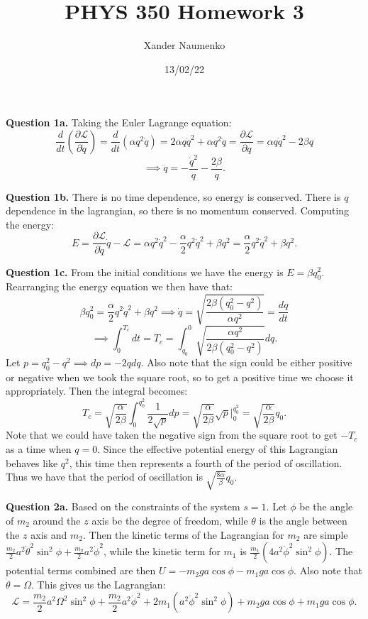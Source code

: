 \documentclass[letterpaper, reqno,11pt]{article}
\begin{document}
\title{PHYS 350 Homework 3}
\date{13/02/22}
\author{Xander Naumenko}
\maketitle

{\noindent\bf Question 1a.} Taking the Euler Lagrange equation: 
\[
\frac{d}{dt}\left( \frac{\partial\mathcal L}{\partial \dot q} \right)=\frac{d}{dt}\left( \alpha q^2\dot q\right)=2\alpha q\dot q^2+\alpha q^2\ddot q=\frac{\partial\mathcal L}{\partial q}=\alpha q\dot q^2-2\beta q
\]
\[
\implies\ddot q=-\frac{\dot q^2}{q}-\frac{2\beta}{q}
.\]

{\noindent\bf Question 1b.} There is no time dependence, so energy is conserved. There is $q$ dependence in the lagrangian, so there is no momentum conserved. Computing the energy: 
\[
E=\frac{\partial\mathcal L}{\partial \dot q}\dot q-\mathcal L=\alpha q^2\dot q^2-\frac{\alpha}{2}q^2\dot q^2+\beta q^2=\frac{\alpha}{2} q^2\dot q^2+\beta q^2
.\]

{\noindent\bf Question 1c.} From the initial conditions we have the energy is $E=\beta q_0^2$. Rearranging the energy equation we then have that: 
\[
\beta q_0^2=\frac{\alpha}{2} q^2\dot q^2+\beta q^2\implies \dot q=\sqrt{\frac{2\beta\left( q_0^2-q^2 \right) }{\alpha q^2}}=\frac{dq}{dt}
\]
\[
\implies \int_0^{T_c} dt=T_c=\int_{q_0}^0 \sqrt{\frac{\alpha q^2}{2\beta\left( q_0^2-q^2 \right) }} dq
.\]
Let $p=q_0^2-q^2\implies dp=-2qdq$. Also note that the sign could be either positive or negative when we took the square root, so to get a positive time we choose it appropriately. Then the integral becomes: 
\[
T_c=\sqrt{\frac{\alpha}{2\beta}} \int_{0}^{q_0^2} \frac{1}{2\sqrt{p} }dp=\sqrt{\frac{\alpha}{2\beta}}\sqrt{p} \bigg|_0^{q_0^2}=\sqrt{\frac{\alpha}{2\beta}} q_0
.\]
Note that we could have taken the negative sign from the square root to get $-T_c$ as a time when $q=0$. Since the effective potential energy of this Lagrangian behaves like $q^2$, this time then represents a fourth of the period of oscillation. Thus we have that the period of oscillation is $ \sqrt{\frac{8\alpha}{\beta}} q_0$. 

{\noindent\bf Question 2a.} Based on the constraints of the system $s=1$. Let $\phi$ be the angle of $ m_2$ around the $z$ axis be the degree of freedom, while $\theta$ is the angle between the $z$ axis and $m_2$. Then the kinetic terms of the Lagrangian for $m_2$ are simple $ \frac{m_2}{2}a^2\dot\theta ^2\sin^2\phi+\frac{m_2}{2}a^2\dot\phi^2 $, while the kinetic term for $m_1$ is $\frac{m_1}{2}\left( 4a^2\dot\phi^2\sin^2\phi \right) $. The potential terms combined are then $U=-m_2ga\cos\phi-m_1ga\cos\phi$. Also note that $\dot\theta=\Omega$. This gives us the Lagrangian: 
\[
\mathcal L=\frac{m_2}{2}a^2\Omega^2\sin^2\phi+\frac{m_2}{2}a^2\dot\phi^2+2m_1\left( a^2\dot\phi^2\sin^2\phi \right)+m_2ga\cos\phi+m_1ga\cos\phi
.\]
\end{document}
